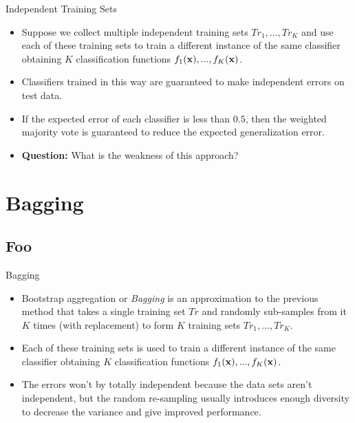 \documentclass[serif,xcolor=pdftex,dvipsnames,table,hyperref={bookmarks=false,breaklinks}]{beamer}
\begin{document}
\begin{frame}[t]{Independent Training Sets}

\begin{itemize}
\setlength{\itemsep}{8pt}

\item Suppose we collect multiple independent training sets $Tr_1,...,Tr_K$ and use 
each of these training sets to train a different instance of the same classifier obtaining
$K$ classification functions $f_1({\mathbf{x}}),...,f_K({\mathbf{x}})$.

\pause\item Classifiers trained in this way are guaranteed to make independent errors on test data. 

\pause\item If the expected error of each classifier is less than $0.5$, then the weighted
majority vote is guaranteed to reduce the expected generalization error.

\pause\item \textbf{Question:} What is the weakness of this approach?
\end{itemize}

\end{frame}

\section{Bagging}
\subsection{Foo}

\begin{frame}[t]{Bagging}

\begin{itemize}
\setlength{\itemsep}{8pt}

\item Bootstrap aggregation or \textit{Bagging} is an approximation to the previous method that takes a single training set $Tr$ and randomly sub-samples from it $K$ times (with replacement) to form $K$ training sets $Tr_1,...,Tr_K$.

\pause\item Each of these training sets is used to train a different instance of the same classifier obtaining $K$ classification functions $f_1({\mathbf{x}}),...,f_K({\mathbf{x}})$.

\pause\item The errors won't by totally independent because the data sets aren't independent, but the random re-sampling usually introduces enough diversity to decrease the variance and give improved performance.

\end{itemize}

\end{frame}
\end{document}
